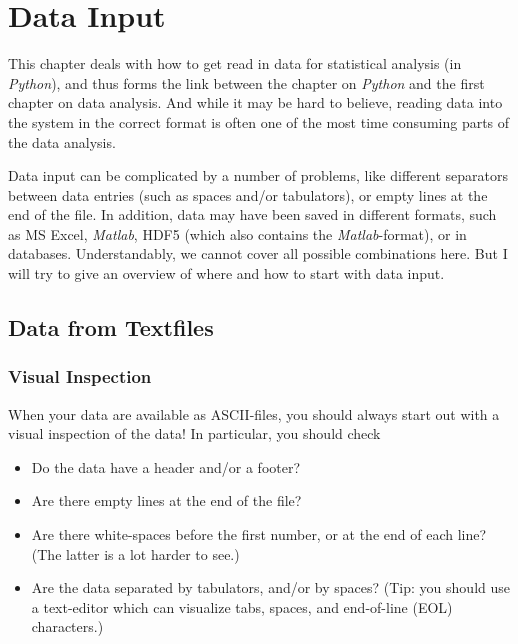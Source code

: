 \chapter{Data Input}

This chapter deals with how to get read in data for statistical analysis (in \emph{Python}), and thus forms the link between the chapter on \emph{Python} and the first chapter on data analysis. And while it may be hard to believe, reading data into the system in the correct format is often one of the most time consuming parts of the data analysis.

\vspace{5 mm}

Data input can be complicated by a number of problems, like different separators between data entries (such as spaces and/or tabulators), or empty lines at the end of the file. In addition, data may have been saved in different formats, such as MS Excel, \emph{Matlab},  HDF5 (which also contains the \emph{Matlab}-format), or in databases. Understandably, we cannot cover all possible combinations here. But I will try to give an overview of where and how to start with data input.

\section{Data from Textfiles}

\subsection{Visual Inspection}

When your data are available as ASCII-files, you should always start out with a visual inspection of the data! In particular, you should check

\begin{itemize}
  \item Do the data have a header and/or a footer?
  \item Are there empty lines at the end of the file?
  \item Are there white-spaces before the first number, or at the end of each line? (The latter is a lot harder to see.)
  \item Are the data separated by tabulators, and/or by spaces? (Tip: you should use a text-editor which can visualize tabs, spaces, and end-of-line (EOL) characters.)
\end{itemize}

